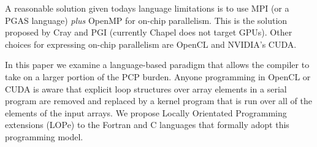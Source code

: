 A reasonable solution given todays language limitations is to use MPI (or a PGAS
language) \emph{plus} OpenMP for on-chip parallelism.  This is the solution proposed
by Cray and PGI \cite{BOF_SC10} (currently Chapel does not target GPUs\cite{Brad?}).
Other choices for expressing on-chip parallelism are OpenCL\cite{OPENCL} and NVIDIA's CUDA.

In this paper we examine a language-based paradigm that allows the compiler to
take on a larger portion of the PCP burden.  Anyone programming in OpenCL or
CUDA is aware that explicit loop structures over array elements in a serial
program are removed and replaced by a kernel program that is run over all of the
elements of the input arrays.  We propose Locally Orientated Programming
extensions (LOPe) to the Fortran and C languages that formally adopt this
programming model.

